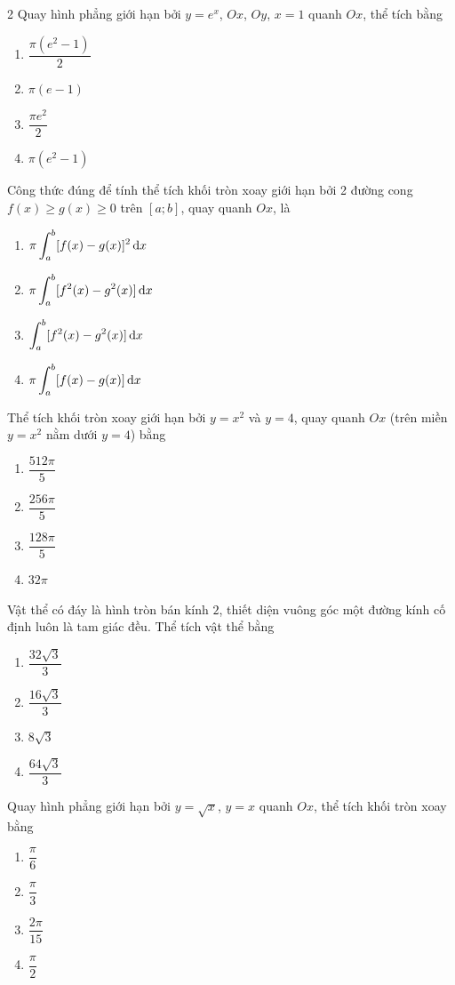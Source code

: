 \begin{multicols}{2}
\cauhoi Quay hình phẳng giới hạn bởi $y=e^x$, $Ox$, $Oy$, $x=1$ quanh $Ox$, thể tích bằng
\begin{enumerate}[label=\textbf{\Alph*.}, leftmargin=0.9cm]
  \item $\dfrac{\pi(e^2-1)}{2}$
  \item $\pi(e-1)$
  \item $\dfrac{\pi e^2}{2}$
  \item $\pi(e^2-1)$
\end{enumerate}

\cauhoi Công thức đúng để tính thể tích khối tròn xoay giới hạn bởi 2 đường cong $f(x)\ge g(x)\ge0$ trên $[a;b]$, quay quanh $Ox$, là
\begin{enumerate}[label=\textbf{\Alph*.}, leftmargin=0.9cm]
  \item $\pi\displaystyle\int_a^b[f(x)-g(x)]^2\,\mathrm{d}x$
  \item $\pi\displaystyle\int_a^b[f^2(x)-g^2(x)]\,\mathrm{d}x$
  \item $\displaystyle\int_a^b[f^2(x)-g^2(x)]\,\mathrm{d}x$
  \item $\pi\displaystyle\int_a^b[f(x)-g(x)]\,\mathrm{d}x$
\end{enumerate}

\cauhoi Thể tích khối tròn xoay giới hạn bởi $y=x^2$ và $y=4$, quay quanh $Ox$ (trên miền $y=x^2$ nằm dưới $y=4$) bằng
\begin{enumerate}[label=\textbf{\Alph*.}, leftmargin=0.9cm]
  \item $\dfrac{512\pi}{5}$
  \item $\dfrac{256\pi}{5}$
  \item $\dfrac{128\pi}{5}$
  \item $32\pi$
\end{enumerate}

\cauhoi Vật thể có đáy là hình tròn bán kính $2$, thiết diện vuông góc một đường kính cố định luôn là tam giác đều. Thể tích vật thể bằng
\begin{enumerate}[label=\textbf{\Alph*.}, leftmargin=0.9cm]
  \item $\dfrac{32\sqrt3}{3}$
  \item $\dfrac{16\sqrt3}{3}$
  \item $8\sqrt3$
  \item $\dfrac{64\sqrt3}{3}$
\end{enumerate}

\cauhoi Quay hình phẳng giới hạn bởi $y=\sqrt{x}$, $y=x$ quanh $Ox$, thể tích khối tròn xoay bằng
\begin{enumerate}[label=\textbf{\Alph*.}, leftmargin=0.9cm]
  \item $\dfrac{\pi}{6}$
  \item $\dfrac{\pi}{3}$
  \item $\dfrac{2\pi}{15}$
  \item $\dfrac{\pi}{2}$
\end{enumerate}


\end{multicols}
